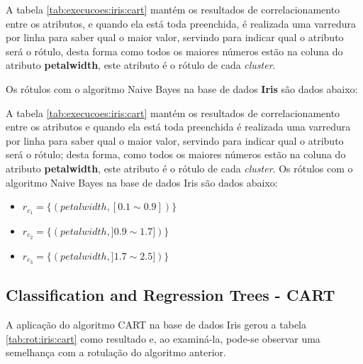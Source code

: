 A tabela \ref{tab:execucoes:iris:cart} mantém os resultados de correlacionamento entre os atributos, e quando ela está toda preenchida, é realizada uma varredura por linha para saber qual o maior valor,  servindo para indicar qual o atributo será o rótulo, desta forma como todos os maiores números estão na coluna do atributo \textbf{petalwidth}, este atributo é o rótulo de cada \textit{cluster}.

Os rótulos com o algoritmo Naive Bayes na base de dados \textbf{Iris} são dados abaixo:

A tabela \ref{tab:execucoes:iris:cart} mantém os resultados de correlacionamento entre os atributos e quando ela está toda preenchida é realizada uma varredura por linha para saber qual o maior valor, servindo para indicar qual o atributo será o rótulo; desta forma, como todos os maiores números estão na coluna do atributo \textbf{petalwidth}, este atributo é o rótulo de cada \textit{cluster}. Os rótulos com o algoritmo Naive Bayes na base de dados Iris são dados abaixo: 

\begin{itemize}[noitemsep]
 \item ${r_{c_1}=\{ (petalwidth,[ 0.1 \sim 0.9 ] ) \} }$  
 \item ${r_{c_2}=\{ (petalwidth, ] 0.9 \sim 1.7]) \} }$
 \item ${r_{c_3}=\{ (petalwidth, ] 1.7 \sim 2.5 ]) \} }$
\end{itemize}

\subsection{Classification and Regression Trees - CART} \label{cap:resultados:ssec:iris:cart}


A aplicação do algoritmo CART na base de dados Iris gerou a tabela \ref{tab:rot:iris:cart} como resultado e, ao examiná-la, pode-se observar uma semelhança com a rotulação do algoritmo anterior.

